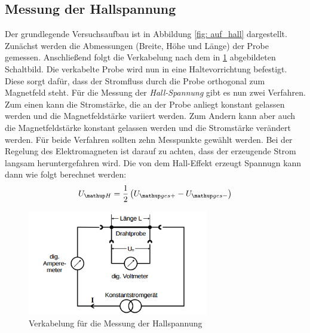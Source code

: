 \subsection{Messung der Hallspannung}
Der grundlegende Versuchsaufbau ist in Abbildung \ref{fig: auf_hall} dargestellt.
Zunächst werden die Abmessungen (Breite, Höhe und Länge) der Probe gemessen.
Anschließend folgt die Verkabelung nach dem in \ref{fig: kabel_hall} abgebildeten Schaltbild.
Die verkabelte Probe wird nun in eine Haltevorrichtung befestigt. Diese sorgt dafür, dass %
der Stromfluss durch die Probe orthogonal zum Magnetfeld steht.
Für die Messung der \emph{Hall-Spannung} gibt es nun zwei Verfahren.
Zum einen kann die Stromstärke, die an der Probe anliegt konstant gelassen werden und
die Magnetfeldstärke variiert werden. Zum Andern kann
aber auch die Magnetfeldstärke konstant gelassen werden und die Stromstärke verändert
werden. Für beide Verfahren sollten zehn Messpunkte gewählt werden.
Bei der Regelung des Elektromagneten ist darauf zu achten, dass der
erzeugende Strom langsam heruntergefahren wird.
Die von dem Hall-Effekt erzeugt Spannugn kann dann wie folgt berechnet werden: %
\begin{equation} %
\label{eq:hall_spann}
U\ua{H}=\frac{1}{2}\left(U\ua{ges+}-U\ua{ges-}\right)
\end{equation}

\begin{figure}
  \centering
  \includegraphics[width=0.7\textwidth]{pics/verkabelung_hall.png}
  \caption{Verkabelung für die Messung der Hallspannung}
  \label{fig: kabel_hall}
\end{figure}
